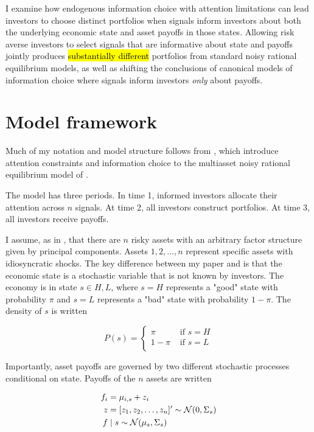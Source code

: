 \documentclass{article}
\begin{document}
I examine how endogenous information choice with attention limitations can lead investors to choose distinct portfolios when signals inform investors about both the underlying economic state and asset payoffs in those states. Allowing risk averse investors to select signals that are informative about state and payoffs jointly produces \hl{substantially different}  portfolios from standard noisy rational equilibrium models, as well as shifting the conclusions of canonical models of information choice where signals inform investors \textit{only} about payoffs.


\section{Model framework}

Much of my notation and model structure follows from \textcite{kacperczyk_rational_2016},  which introduce attention constraints and information choice to the multiasset noisy rational equilibrium model of \textcite{admati_noisy_1985}.

The model has three periods. In time 1, informed investors allocate their attention across $n$ signals. At time 2, all investors construct portfolios. At time 3, all investors receive payoffs.

I assume, as in \textcite{kacperczyk_rational_2016}, that there are $n$ risky assets with an arbitrary factor structure given by principal components. Assets $1,2,\dots,n$ represent specific assets with idiosyncratic shocks. The key difference between my paper and \textcite{kacperczyk_rational_2016} is that the economic state is a stochastic variable that is not known by investors. The economy is in state $s \in {H, L}$, where $s=H$ represents a "good" state with probability $\pi$ and $s=L$ represents a "bad" state with probability $1-\pi$. The density of $s$ is written

$$
P(s) = \begin{cases}
    \pi & \text{ if } s = H \\
    1-\pi & \text{ if } s = L \\
\end{cases}
$$

Importantly, asset payoffs are governed by two different stochastic processes conditional on state. Payoffs of the $n$ assets are written

\begin{align}
    f_i &= \mu_{i,s} + z_i\\
    z &= [z_1,z_2, \dots, z_n]' \sim \mathcal{N}(0, \Sigma_s) \\
    f &\mid s \sim \mathcal{N}(\mu_{s}, \Sigma_s)
\end{align}
\end{document}
